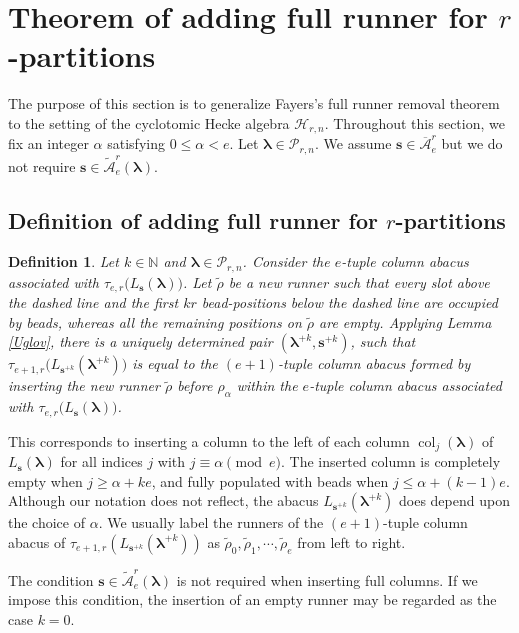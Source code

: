 \documentclass[a4paper,10pt]{amsart}
\theoremstyle{plain}
\renewcommand{\H}{\mathcal{H}}
\def\bs{{\boldsymbol{s}}}
\def\N{{\mathbb N}}
\def\PP{\mathscr{P}}
\def\blam{{\boldsymbol \lambda}}
\DeclareMathOperator{\col}{col}
\theoremstyle{plain}
\newtheorem{dfn}[theorem]{Definition}
\numberwithin{equation}{section}
\begin{document}
\bigskip
\section{Theorem of adding full runner for $r$-partitions}

The purpose of this section is to generalize Fayers's full runner removal theorem \cite{Fay08} to the setting of the cyclotomic Hecke algebra $\H_{r,n}$. Throughout this section, we fix an integer \(\alpha\) satisfying \(0\le \alpha<e\). Let $\blam\in\PP_{r,n}$. We assume $\bs \in \overline{\mathcal A}^r_e$ but we do not require $\bs \in \widetilde{\mathcal A}^r_e(\blam)$.

\medskip
\subsection{Definition of adding full runner for $r$-partitions}

\begin{dfn}\label{Plusk} Let $k\in\N$ and $\blam\in\PP_{r,n}$. Consider the $e$-tuple column abacus associated with \(\tau_{e, r}\big(L_{\boldsymbol{s}}(\boldsymbol{\lambda})\big)\). Let  \(\tilde{\rho}\) be a new runner such that every slot above the dashed line and the first $kr$ bead-positions below the dashed line are occupied by beads, whereas all the remaining positions on \(\tilde{\rho}\) are empty. Applying Lemma \ref{Uglov}, there is a uniquely determined pair $(\blam^{+k},\bs^{+k})$, such that \(\tau_{e+1, r}\big(L_{\boldsymbol{s}^{+k}}(\boldsymbol{\lambda}^{+k})\big)\) is equal to the $(e+1)$-tuple column abacus formed by inserting the new runner \(\tilde{\rho}\) before \(\rho_\alpha\) within the $e$-tuple column abacus associated with \(\tau_{e, r}\big(L_{\boldsymbol{s}}(\boldsymbol{\lambda})\big)\).
\end{dfn}

This corresponds to inserting a column to the left of each column \(\col_j(\blam)\) of \(L_{\boldsymbol{s}}(\boldsymbol{\lambda})\) for all indices $j$ with \(j\equiv \alpha\pmod e\). The inserted column is completely empty when \(j\ge \alpha+ke\), and fully populated with beads when \(j\le \alpha+(k-1)e\). Although our notation does not reflect,  the abacus $L_{\bs^{+k}}(\blam^{+k})$ does depend upon the choice of $\alpha$. We usually label the runners of the $(e+1)$-tuple column abacus of $\tau_{e+1,r}({L}_{\bs^{+k}}(\blam^{+k}))$ as $\tilde{\rho}_0,\tilde{\rho}_1,\cdots,\tilde{\rho}_{e}$ from left to right.

The condition \(\boldsymbol{s} \in \widetilde{\mathcal A}^r_e(\boldsymbol{\lambda})\) is not required when inserting full columns. If we impose this condition, the insertion of an empty runner may be regarded as the case \(k=0\).
\end{document}
